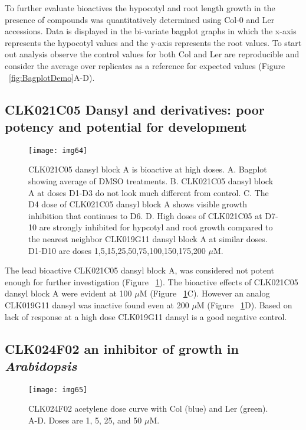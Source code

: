 To further evaluate bioactives the hypocotyl and root length growth in the presence of compounds was quantitatively determined using Col-0 and Ler accessions. Data is displayed in the bi-variate bagplot graphs in which the x-axis represents the hypocotyl values and the y-axis represents the root values. To start out analysis observe the control values for both Col and Ler are reproducible and consider the average over replicates as a reference for expected values (Figure ~\ref{fig:BagplotDemo}A-D). 


\subsection{CLK021C05 Dansyl and derivatives: poor potency and potential for development}

\begin{figure}
\centering
\texttt{[image: img64]}
\caption{CLK021C05 dansyl block A is bioactive at high doses. A. Bagplot showing average of DMSO treatments. B. CLK021C05 dansyl block A at doses D1-D3 do not look much different from control. C. The D4 dose of CLK021C05 dansyl block A shows visible growth inhibition that continues to D6. D. High doses of CLK021C05 at D7-10 are strongly inhibited for hypcotyl and root growth compared to the nearest neighbor CLK019G11 dansyl block A at similar doses. D1-D10 are doses 1,5,15,25,50,75,100,150,175,200 $\mu$M.}
\label{fig:CLK021C05OpenShut}
\end{figure}

The lead bioactive CLK021C05 dansyl block A, was considered not potent enough for further investigation (Figure ~\ref{fig:CLK021C05OpenShut}). The bioactive effects of CLK021C05 dansyl block A were evident at 100 $\mu$M (Figure ~\ref{fig:CLK021C05OpenShut}C). However an analog CLK019G11 dansyl was inactive found even at 200 $\mu$M (Figure ~\ref{fig:CLK021C05OpenShut}D). Based on lack of response at a high dose CLK019G11 dansyl is a good negative control. 

\subsection{CLK024F02 an inhibitor of growth in {\it Arabidopsis}}

\begin{figure}
\centering
\texttt{[image: img65]}
\caption{CLK024F02 acetylene dose curve with Col (blue) and Ler (green). A-D. Doses are 1, 5, 25, and 50 $\mu$M.}
\label{fig:CLK024F02RH}
\end{figure}

